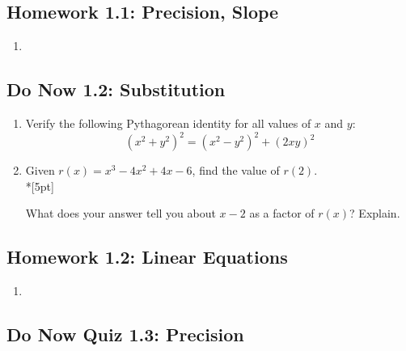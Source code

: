 \documentclass[12pt, oneside]{article}
\begin{document}
\newpage
\subsection*{Homework 1.1: Precision, Slope}
\begin{enumerate}
  \item
\end{enumerate}


\newpage
\subsection*{Do Now 1.2: Substitution}
\begin{enumerate}

  \emph{Spicy}
  \item %
  Verify the following Pythagorean identity for all values of $x$ and $y$:
  \[(x^2+y^2)^2=(x^2-y^2)^2+(2xy)^2\]

  \item %
  Given $r(x) = x^3  - 4x^2 +4x -6$, find the value of $r(2)$.\\*[5pt]

  What does your answer tell you about $x - 2$ as a factor of $r(x)$? Explain.

\end{enumerate}


\newpage
\subsection*{Homework 1.2: Linear Equations}
\begin{enumerate}
  \item
\end{enumerate}

\newpage
\subsection*{Do Now Quiz 1.3: Precision}
\end{document}

